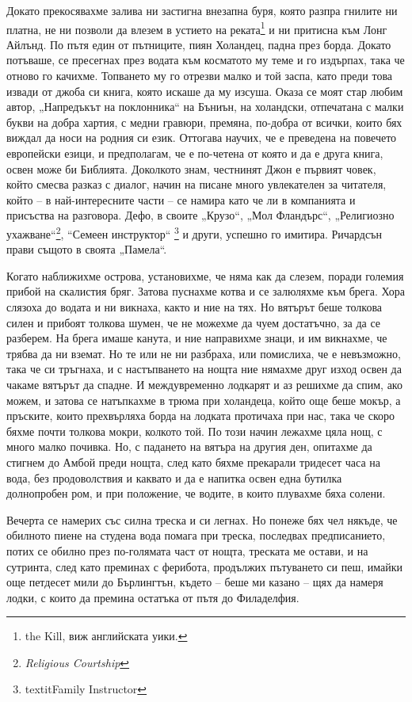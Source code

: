 \documentclass[12pt]{book}
\begin{document}
Докато прекосявахме залива ни застигна внезапна буря, която разпра гнилите ни платна, не ни позволи да влезем в устието на реката\footnote{the Kill, виж английската уики.} и ни притисна към Лонг Айлънд. По пътя един от пътниците, пиян Холандец, падна през борда. Докато потъваше, се пресегнах през водата към косматото му теме и го издърпах, така че отново го качихме. Топването му го отрезви малко и той заспа, като преди това извади от джоба си книга, която искаше да му изсуша. Оказа се моят стар любим автор, „Напредъкът на поклонника“ на Бъниън, на холандски, отпечатана с малки букви на добра хартия, с медни гравюри, премяна, по-добра от всички, които бях виждал да носи на родния си език. Оттогава научих, че е преведена на повечето европейски езици, и предполагам, че е по-четена от която и да е друга книга, освен може би Библията. Доколкото знам, честнинят Джон е първият човек, който смесва разказ с диалог, начин на писане много увлекателен за читателя, който – в най-интересните части – се намира като че ли в компанията и присъства на разговора. Дефо, в своите „Крузо“, „Мол Фландърс“, „Религиозно ухажване“\footnote{\textit{Religious Courtship}}, “Семеен инструктор“ \footnote{textit{Family Instructor}} и други, успешно го имитира. Ричардсън прави същото в своята „Памела“.

Когато наближихме острова, установихме, че няма как да слезем, поради големия прибой на скалистия бряг. Затова пуснахме котва и се залюляхме към брега. Хора слязоха до водата и ни викнаха, както и ние на тях. Но вятърът беше толкова силен и прибоят толкова шумен, че не можехме да чуем достатъчно, за да се разберем. На брега имаше канута, и ние направихме знаци, и им викнахме, че трябва да ни вземат. Но те или не ни разбраха, или помислиха, че е невъзможно, така че си тръгнаха, и с настъпването на нощта ние нямахме друг изход освен да чакаме вятърът да спадне. И междувременно лодкарят и аз решихме да спим, ако можем, и затова се натъпкахме в трюма при холандеца, който още беше мокър, а пръските, които прехвърляха борда на лодката протичаха при нас, така че скоро бяхме почти толкова мокри, колкото той. По този начин лежахме цяла нощ, с много малко почивка. Но, с падането на вятъра на другия ден, опитахме да стигнем до Амбой преди нощта, след като бяхме прекарали тридесет часа на вода, без продоволствия и каквато и да е напитка освен една бутилка долнопробен ром, и при положение, че водите, в които плувахме бяха солени. 

Вечерта се намерих със силна треска и си легнах. Но понеже бях чел някъде, че обилното пиене на студена вода помага при треска, последвах предписанието, потих се обилно през по-голямата част от нощта, треската ме остави, и на сутринта, след като преминах с ферибота, продължих пътуването си пеш, имайки още петдесет мили до Бърлингтън, където – беше ми казано – щях да намеря лодки, с които да премина остатъка от пътя до Филаделфия. 
\end{document}
